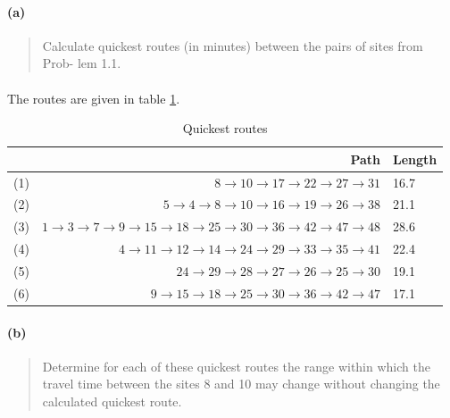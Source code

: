 \paragraph{(a)}
\begin{quote}
Calculate quickest routes (in minutes) between the pairs of sites from Prob- lem 1.1.
\end{quote}

\paragraph{}
The routes are given in table \ref{quickest_routes_12}.

\begin{table}[H]
\centering
\begin{tabular}{|c|r|l|}
\hline
 & Path & Length \\ \hline
(1) & $ 8 \rightarrow 10 \rightarrow 17 \rightarrow 22 \rightarrow 27 \rightarrow 31 $ & 16.7 \\ \hline
(2) & $ 5 \rightarrow 4 \rightarrow 8 \rightarrow 10 \rightarrow 16 \rightarrow 19 \rightarrow 26 \rightarrow 38 $ & 21.1 \\ \hline
(3) & $ 1 \rightarrow 3 \rightarrow 7 \rightarrow 9 \rightarrow 15 \rightarrow 18 \rightarrow 25 \rightarrow 30 \rightarrow 36 \rightarrow 42 \rightarrow 47 \rightarrow 48 $ & 28.6 \\ \hline
(4) & $ 4 \rightarrow 11 \rightarrow 12 \rightarrow 14 \rightarrow 24 \rightarrow 29 \rightarrow 33 \rightarrow 35 \rightarrow 41 $ & 22.4 \\ \hline
(5) & $ 24 \rightarrow 29 \rightarrow 28 \rightarrow 27 \rightarrow 26 \rightarrow 25 \rightarrow 30 $ & 19.1 \\ \hline
(6) & $ 9 \rightarrow 15 \rightarrow 18 \rightarrow 25 \rightarrow 30 \rightarrow 36 \rightarrow 42 \rightarrow 47 $ & 17.1 \\ \hline
\end{tabular}
\caption{Quickest routes}
\label{quickest_routes_12}
\end{table}

\paragraph{(b)}
\begin{quote}
Determine for each of these quickest routes the range within which the travel time between the sites 8 and 10 may change without changing the calculated quickest route.
\end{quote}

